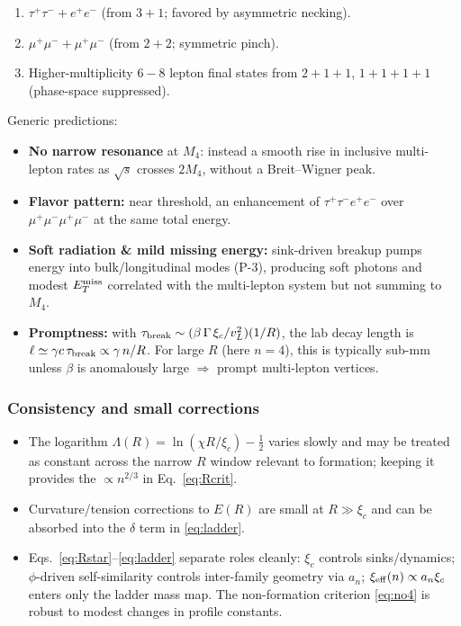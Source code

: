 \begin{enumerate}
\item \(\tau^+\tau^- + e^+e^-\) (from \(3{+}1\); favored by asymmetric necking).
\item \(\mu^+\mu^- + \mu^+\mu^-\) (from \(2{+}2\); symmetric pinch).
\item Higher-multiplicity \(6\!-\!8\) lepton final states from \(2{+}1{+}1\), \(1{+}1{+}1{+}1\) (phase-space suppressed).
\end{enumerate}

Generic predictions:
\begin{itemize}
\item \textbf{No narrow resonance} at \(M_4\): instead a smooth rise in inclusive multi-lepton rates as \(\sqrt{s}\) crosses \(2M_4\), without a Breit–Wigner peak.
\item \textbf{Flavor pattern:} near threshold, an enhancement of \(\tau^+\tau^- e^+e^-\) over \(\mu^+\mu^-\mu^+\mu^-\) at the same total energy.
\item \textbf{Soft radiation \& mild missing energy:} sink-driven breakup pumps energy into bulk/longitudinal modes (P-3), producing soft photons and modest \(E_T^{\rm miss}\) correlated with the multi-lepton system but not summing to \(M_4\).
\item \textbf{Promptness:} with \(\tau_{\rm break}\sim(\beta\,\Gamma\,\xi_c/v_L^2)(1/R)\), the lab decay length is \(\ell\simeq \gamma c\,\tau_{\rm break}\propto \gamma\,n/R\). For large \(R\) (here \(n{=}4\)), this is typically sub-mm unless \(\beta\) is anomalously large \(\Rightarrow\) prompt multi-lepton vertices.
\end{itemize}

\subsubsection{Consistency and small corrections}
\begin{itemize}
\item The logarithm \(\Lambda(R)=\ln(\chi R/\xi_c)-\tfrac12\) varies slowly and may be treated as constant across the narrow \(R\) window relevant to formation; keeping it provides the \(\propto n^{2/3}\) in Eq.~\eqref{eq:Rcrit}.
\item Curvature/tension corrections to \(E(R)\) are small at \(R\!\gg\!\xi_c\) and can be absorbed into the \(\delta\) term in \eqref{eq:ladder}.
\item Eqs.~\eqref{eq:Rstar}--\eqref{eq:ladder} separate roles cleanly: \(\xi_c\) controls sinks/dynamics; \(\phi\)-driven self-similarity controls inter-family geometry via \(a_n\); \(\xi_{\rm eff}(n)\propto a_n\xi_c\) enters only the ladder mass map. The non-formation criterion \eqref{eq:no4} is robust to modest changes in profile constants.
\end{itemize}

